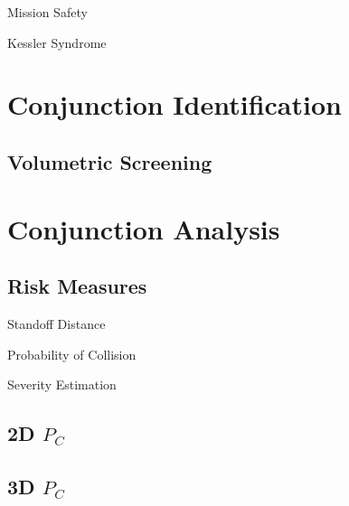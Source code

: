 \documentclass[pdf]{beamer}
\begin{document}
\begin{frame}{Mission Safety}
\end{frame}

\begin{frame}{Kessler Syndrome}
\end{frame}

\section{Conjunction Identification}
\subsection{Volumetric Screening}

\section{Conjunction Analysis}
\subsection{Risk Measures}

\begin{frame}{Standoff Distance}
\end{frame}

\begin{frame}{Probability of Collision}
\end{frame}

\begin{frame}{Severity Estimation}
\end{frame}

\subsection{2D $P_C$}

\subsection{3D $P_C$}
\end{document}

